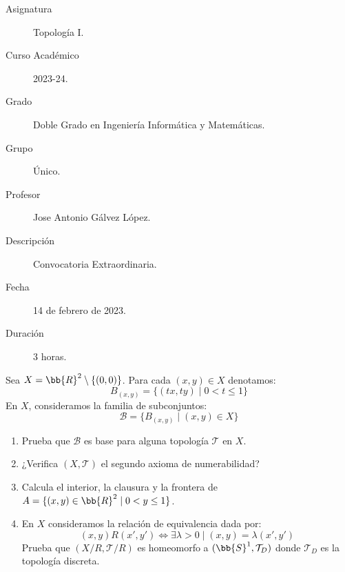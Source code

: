 \documentclass[12pt]{article}
\newcounter{ejercicio}[section] %
\newcounter{ejercicio}
\begin{document}

    
    

    \begin{description}
        \item[Asignatura] Topología I.
        \item[Curso Académico] 2023-24.
        \item[Grado] Doble Grado en Ingeniería Informática y Matemáticas.
        \item[Grupo] Único.
        \item[Profesor] Jose Antonio Gálvez López.
        \item[Descripción] Convocatoria Extraordinaria.
        \item[Fecha] 14 de febrero de 2023.
        \item[Duración] 3 horas.
    
    \end{description}
    \newpage

    \begin{ejercicio}[4.5 puntos]
        Sea $X = \bb{R}^2 \setminus \{(0,0)\}$. Para cada $(x,y) \in X$ denotamos:
        $$B_{(x,y)} = \{(tx, ty) \mid 0 < t \leq 1 \}$$
        En $X$, consideramos la familia de subconjuntos:
        $$\mathcal{B} = \{B_{(x,y)} \mid (x,y) \in X\}$$
        \begin{enumerate}[label=(\alph*)]
            \item Prueba que $\mathcal{B}$ es base para alguna topología $\mathcal{T}$ en $X$.
            \item ¿Verifica $(X, \mathcal{T})$ el segundo axioma de numerabilidad?
            \item Calcula el interior, la clausura y la frontera de $A = \{ (x,y) \in \bb{R}^2 \mid 0 < y \leq 1\}$.
            \item En $X$ consideramos la relación de equivalencia dada por:
                $$(x,y)R(x',y') \Leftrightarrow \exists \lambda > 0 \mid (x,y) = \lambda(x',y')$$
                Prueba que $(X/R, \mathcal{T}/R)$ es homeomorfo a $(\bb{S}^1, \mathcal{T}_D)$ donde $\mathcal{T}_D$ es la topología discreta.
        \end{enumerate}
    \end{ejercicio}
        
\end{document}
